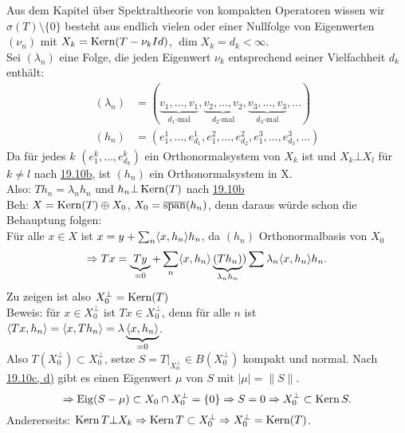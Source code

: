 \begin{beweis}
	Aus dem Kapitel über Spektraltheorie von kompakten Operatoren wissen wir $\sigma(T) \setminus \{ 0 \}$ besteht aus endlich vielen oder einer Nullfolge von Eigenwerten $(\nu_{n})$ mit $X_{k} = \mathop{\rm Kern}\nolimits( T - \nu_{k} Id )$, $\dim X_{k} = d_{k} < \infty$. \\
	Sei $(\lambda_{n})$ eine Folge, die jeden Eigenwert $\nu_{k}$ entsprechend seiner Vielfachheit $d_{k}$ enthält:
\begin{align*}
	(\lambda_{n}) & = (\underbrace{v_{1}, \dotsc, v_{1}}_{d_{1}\text{-mal}}, \underbrace{v_{2}, \dotsc, v_{2}}_{d_{2}\text{-mal}}, \underbrace{v_{3}, \dotsc, v_{3}}_{d_{3}\text{-mal}}, \dotsc) \\
	(h_{n}) & = (e_{1}^{1}, \dotsc, e_{d_{1}}^{1}, e_{1}^{2}, \dotsc, e_{d_{2}}^{2}, e_{1}^{3}, \dotsc, e_{d_{3}}^{3}, \dotsc)
\end{align*}
Da für jedes $k$ $(e_{1}^{k}, \dotsc, e_{d_{k}}^{k})$ ein Orthonormalsystem von $X_{k}$ ist und $X_{k} \bot X_{l}$ für $k \neq l$ nach \hyperref[lemma:19.10]{19.10b}, ist $(h_{n})$ ein Orthonormalsystem in X. \\ 
Also: $T h_{n} = \lambda_{n} h_{n}$ und $h_{n} \bot \mathop{\rm Kern}\nolimits(T)$ nach \hyperref[lemma:19.10]{19.10b} \\ 
Beh: $X = \mathop{\rm Kern}\nolimits(T) \oplus X_{0}$, $X_{0} = \overline{\operatorname{span}}(h_{n})$, denn daraus würde schon die Behauptung folgen: \\
Für alle $x \in X$ ist $x = y + \sum_{n} \langle x , h_{n} \rangle h_{n}$, da $(h_{n})$ Orthonormalbasis von  $X_{0}$
	\[ \Rightarrow T x = \underbrace{T y}_{= 0} + \sum_{n} \langle x , h_{n} \rangle \underbrace{( T h_{n} )}_{\lambda_{n} h_{n}} ) \sum \lambda_{n} \langle x, h_{n} \rangle h_{n}. \]
Zu zeigen ist also $X_{0}^{\bot} = \mathop{\rm Kern}\nolimits(T)$ \\
Beweis: für $x \in X_{0}^{\bot}$ ist $Tx \in X_{0}^{\bot}$, denn für alle $n$ ist $\langle T x , h_{n} \rangle = \langle x , T h_{n} \rangle = \lambda \underbrace{\langle x , h_{n} \rangle}_{= 0}$. \\
Also $T(X_{0}^{\bot}) \subset X_{0}^{\bot}$, setze $S = T|_{X_{0}^{\bot}} \in B(X_{0}^{\bot})$ kompakt und normal. Nach \hyperref[lemma:19.10]{19.10c, d)} gibt es  einen Eigenwert $\mu$ von $S$ mit $| \mu | = \| S \|$. \\ 
	\[ \Rightarrow \operatorname{Eig}(S - \mu) \subset X_{0} \cap X_{0}^{\bot} = \{  0 \} \Rightarrow S = 0 \Rightarrow X_{0}^{\bot} \subset \mathop{\rm Kern}\nolimits S. \]
Andererseits: $\mathop{\rm Kern}\nolimits T \bot X_{k} \Rightarrow \mathop{\rm Kern}\nolimits T \subset X_{0}^{\bot} \Rightarrow X_{0}^{\bot} = \mathop{\rm Kern}\nolimits(T)$.
\end{beweis}

	
	
\newpage